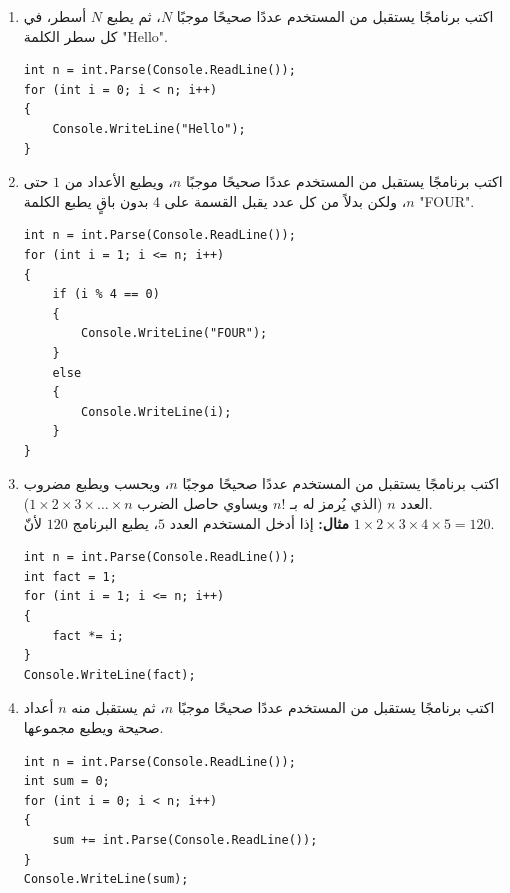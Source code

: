 \documentclass[14pt]{extarticle}
\begin{document}
\begin{enumerate}[resume, itemsep=1em]
\item اكتب برنامجًا يستقبل من المستخدم عددًا صحيحًا موجبًا $N$، ثم يطبع $N$ أسطر، في كل سطر الكلمة \textenglish{"Hello"}.
\ifwithsols
\begin{boxSolution}
\begin{english}
\begin{verbatim}
int n = int.Parse(Console.ReadLine());
for (int i = 0; i < n; i++)
{
    Console.WriteLine("Hello");
}
\end{verbatim}
\end{english}
\end{boxSolution}
\fi
\filbreak

\item اكتب برنامجًا يستقبل من المستخدم عددًا صحيحًا موجبًا $n$، ويطبع الأعداد من $1$ حتى $n$، ولكن بدلاً من كل عدد يقبل القسمة على $4$ بدون باقٍ يطبع الكلمة \textenglish{"FOUR"}.
\ifwithsols
\begin{boxSolution}
\begin{english}
\begin{verbatim}
int n = int.Parse(Console.ReadLine());
for (int i = 1; i <= n; i++)
{
    if (i % 4 == 0)
    {
        Console.WriteLine("FOUR");
    }
    else
    {
        Console.WriteLine(i);
    }
}
\end{verbatim}
\end{english}
\end{boxSolution}
\fi
\filbreak

\item اكتب برنامجًا يستقبل من المستخدم عددًا صحيحًا موجبًا $n$، ويحسب ويطبع مضروب العدد $n$ (الذي يُرمز له بـ $n!$ ويساوي حاصل الضرب $1 \times 2 \times 3 \times \dots \times n$). \\
\textbf{مثال:} إذا أدخل المستخدم العدد $5$، يطبع البرنامج $120$ لأنّ $1 \times 2 \times 3 \times 4 \times 5 = 120$.
\ifwithsols
\begin{boxSolution}
\begin{english}
\begin{verbatim}
int n = int.Parse(Console.ReadLine());
int fact = 1;
for (int i = 1; i <= n; i++)
{
    fact *= i;
}
Console.WriteLine(fact);
\end{verbatim}
\end{english}
\end{boxSolution}
\fi
\filbreak

\item اكتب برنامجًا يستقبل من المستخدم عددًا صحيحًا موجبًا $n$، ثم يستقبل منه $n$ أعداد صحيحة ويطبع مجموعها.
\ifwithsols
\begin{boxSolution}
\begin{english}
\begin{verbatim}
int n = int.Parse(Console.ReadLine());
int sum = 0;
for (int i = 0; i < n; i++)
{
    sum += int.Parse(Console.ReadLine());
}
Console.WriteLine(sum);
\end{verbatim}
\end{english}
\end{boxSolution}
\fi
\filbreak

\end{enumerate}
\end{document}

